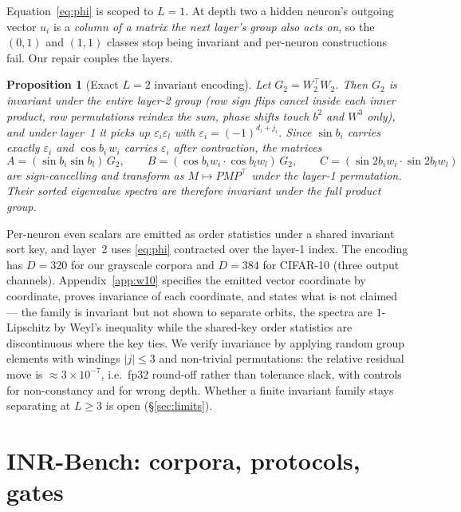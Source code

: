 \documentclass[10pt,letterpaper]{article}
\newtheorem{proposition}[theorem]{Proposition}
\theoremstyle{definition}
\begin{document}
Equation~\eqref{eq:phi} is scoped to $L=1$. At depth two a hidden neuron's outgoing vector $u_i$
is a \emph{column of a matrix the next layer's group also acts on}, so the $(0,1)$ and $(1,1)$
classes stop being invariant and per-neuron constructions fail. Our repair couples the layers.

\begin{proposition}[Exact $L=2$ invariant encoding]\label{prop:deep}
Let $G_2 = W_2^\top W_2$. Then $G_2$ is invariant under the \emph{entire} layer-2 group (row sign
flips cancel inside each inner product, row permutations reindex the sum, phase shifts touch
$b^2$ and $W^3$ only), and under layer~1 it picks up $\varepsilon_i \varepsilon_l$ with
$\varepsilon_i = (-1)^{d_i + j_i}$. Since $\sin b_i$ carries exactly $\varepsilon_i$ and
$\cos b_i\, w_i$ carries $\varepsilon_i$ after contraction, the matrices
\begin{equation}
A = (\sin b_i \sin b_l)\,G_2, \qquad
B = (\cos b_i w_i \!\cdot\! \cos b_l w_l)\,G_2, \qquad
C = (\sin 2b_i w_i \!\cdot\! \sin 2b_l w_l)
\end{equation}
are sign-cancelling and transform as $M \mapsto P M P^\top$ under the layer-1 permutation. Their
sorted eigenvalue spectra are therefore invariant under the full product group.
\end{proposition}

Per-neuron even scalars are emitted as order statistics under a shared invariant sort key, and
layer~2 uses \eqref{eq:phi} contracted over the layer-1 index. The encoding has $D = 320$ for our
grayscale corpora and $D = 384$ for CIFAR-10 (three output channels).
Appendix~\ref{app:w10} specifies the emitted vector coordinate by coordinate, proves invariance of
each coordinate, and states what is not claimed --- the family is invariant but not shown to
separate orbits, the spectra are $1$-Lipschitz by Weyl's inequality while the shared-key order
statistics are discontinuous where the key ties. We verify invariance by
applying random group elements with windings $|j|\le3$ and non-trivial permutations: the relative
residual move is $\approx 3\times10^{-7}$, i.e.\ fp32 round-off rather than tolerance slack, with
controls for non-constancy and for wrong depth. Whether a finite invariant family stays separating
at $L \ge 3$ is open (\S\ref{sec:limits}).

\section{INR-Bench: corpora, protocols, gates}\label{sec:bench}
\end{document}
